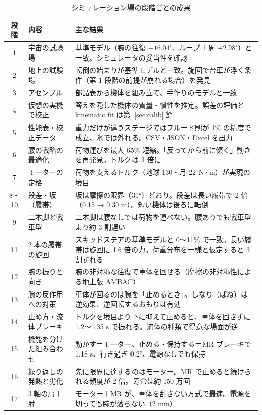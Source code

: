 \documentclass[paper=a4paper,fontsize=10pt,twocolumn,column_gap=2zw,line_length=24zw,number_of_lines=46,head_space=20mm]{jlreq}
\begin{document}
\begin{table}[t]\centering\small
\caption{シミュレーション場の段階ごとの成果}\label{tab:stages}
\setlength{\tabcolsep}{4pt}
\begin{tabular}{clp{}}\toprule
段階 & 内容 & 主な結果 \\\midrule
1 & 宇宙の試験場 & 基準モデル（腕の往復 $-16.04^\circ$、ループ 1 周 $+2.98^\circ$）と一致。シミュレータの妥当性を確認 \\
2 & 地上の試験場 & 転倒の始まりが基準モデルと一致。旋回で台車が浮く条件（第 1 段階の前提が崩れる場合）を発見 \\
3 & アセンブル & 部品表から機体を組み立て、手作りのモデルと一致 \\
4 & 仮想の実機で校正 & 答えを隠した機体の質量・慣性を推定。誤差の評価と kinematic fit は第~\ref{sec:calib} 節 \\
5 & 性能表・校正データ & 重力だけが違うステージではフルード則が 1\% の精度で成立、氷では外れる。CSV・JSON・Excel を出力 \\
6 & 腰の戦略の最適化 & 荷物運びを最大 65\% 短縮。「反ってから前に傾く」動きを再発見。トルクは 3 倍に \\
7 & モーターの定格 & 荷物を支えるトルク（地球 130・月 22 N·m）が実現の境目 \\
8・10 & 段差・坂（履帯） & 坂は摩擦の限界（31°）どおり。段差は長い履帯で 2 倍（0.15 → 0.30 m）。短い機体は後ろに転倒 \\
9 & 二本脚と戦車型 & 二本脚は腰なしでは荷物を運べない。腰ありでも戦車型より約 3 割遅い \\
11 & 2 本の履帯の旋回 & スキッドステアの基準モデルと 0〜11\% で一致。長い履帯は旋回に 1.6 倍の力。荷重分布を一様と仮定すると 3 割ずれる \\
12 & 腕の振りと向き & 腕の非対称な往復で車体を回せる（摩擦の非対称性による地上版 AMBAC） \\
13 & 腕の反作用への対策 & 車体が回るのは腕を「止めるとき」。しなり（ばね）は逆効果、逆回転するおもりは有効 \\
14 & 止め方・流体ブレーキ & トルクを境目より下に抑えて止めると、車体を回さずに 1.2〜1.35 s で振れる。流体の種類で得意な場面が逆 \\
15 & 機能を分けた組み合わせ & 動かす＝モーター、止める・保持する＝MR ブレーキで 1.18 s、行き過ぎ 0.2°、電源なしでも保持 \\
16 & 繰り返しの発熱と劣化 & 先に限界に達するのはモーター。MR で止めると続けられる頻度が 2 倍。寿命は約 150 万回 \\
17 & 3 軸の肩＋肘 & モーター＋MR が、車体を乱さない方式で最速。電源を切っても腕が落ちない（2 mm） \\\bottomrule
\end{tabular}
\end{table}
\end{document}
